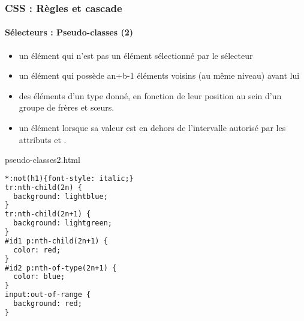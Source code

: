 \documentclass[xcolor=table]{beamer}
\begin{document}
\begin{frame}[fragile]
\frametitle{CSS : Règles et cascade}
\framesubtitle{Sélecteurs : Pseudo-classes (2)}

\begin{minipage}{0.60\textwidth} 
	\begin{itemize}
		\item {} un élément qui n'est pas un élément sélectionné par le sélecteur 
		\item {} un élément qui possède an+b-1 éléments voisins (au même niveau) avant lui 
		\item {} des éléments d'un type donné, en fonction de leur position au sein d'un groupe de frères et sœurs.
		\item {} un élément  lorsque sa valeur est en dehors de l'intervalle autorisé par les attributs  et .
	\end{itemize}
\end{minipage}
%
\begin{minipage}{0.38\textwidth}
\begin{exampleblock}{pseudo-classes2.html}
\scriptsize\bfseries\vspace{-6pt}
\begin{lstlisting}[language={html}]
*:not(h1){font-style: italic;}
tr:nth-child(2n) {
  background: lightblue;
}
tr:nth-child(2n+1) {
  background: lightgreen;
}
#id1 p:nth-child(2n+1) {
  color: red;
}
#id2 p:nth-of-type(2n+1) {
  color: blue;
}
input:out-of-range {
  background: red;
}
\end{lstlisting}\vspace{-6pt}
\end{exampleblock}
\end{minipage}
\end{frame}
\end{document}
